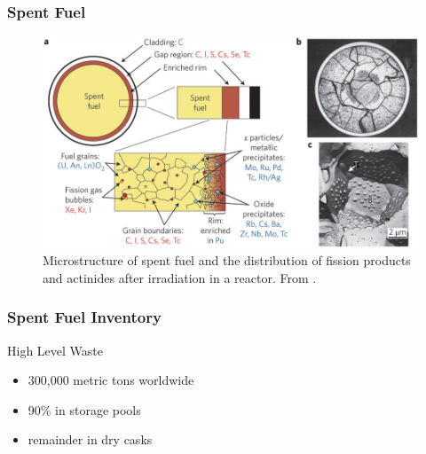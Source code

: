 \begin{frame}[fragile]
        \frametitle{Spent Fuel}
        \begin{figure}
        \includegraphics[width=\textwidth]{./images/ewing-microstructure}
                \caption{Microstructure of spent fuel and the distribution of 
                fission products and actinides after irradiation in a reactor. 
                From \cite{ewing_long-term_2016}.}
        \end{figure}
\end{frame}

\begin{frame}[fragile]
        \frametitle{Spent Fuel Inventory}
\begin{block}{High Level Waste}
        \begin{itemize}
                \item 300,000 metric tons worldwide 
                        \cite{ewing_long-term_2016} 
                \item 90\% in storage pools 
                \item remainder in dry casks
        \end{itemize}
        \end{block}
\end{frame}

